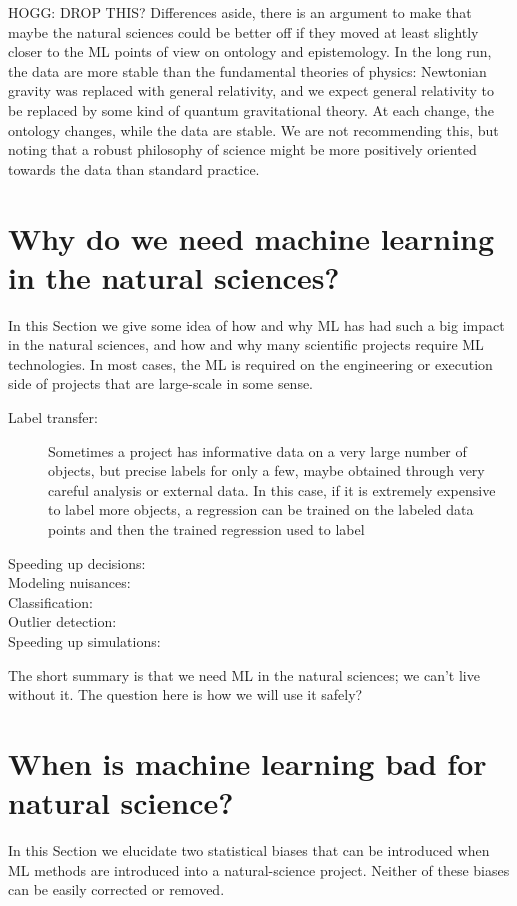 \documentclass[11pt]{article}
\newcommand{\sectionname}{Section}
\begin{document}
HOGG: DROP THIS? Differences aside, there is an argument to make that maybe the natural sciences could be better off if they moved at least slightly closer to the ML points of view on ontology and epistemology.
In the long run, the data are more stable than the fundamental theories of physics:
Newtonian gravity was replaced with general relativity, and we expect general relativity to be replaced by some kind of quantum gravitational theory.
At each change, the ontology changes, while the data are stable.
We are not recommending this, but noting that a robust philosophy of science might be more positively oriented towards the data than standard practice.

\section{Why do we need machine learning in the natural sciences?}
In this \sectionname{} we give some idea of how and why ML has had such a big impact in the natural sciences, and how and why many scientific projects require ML technologies.
In most cases, the ML is required on the engineering or execution side of projects that are large-scale in some sense.
\begin{description}
  \item[Label transfer:] Sometimes a project has informative data on a very large number of objects, but precise labels for only a few, maybe obtained through very careful analysis or external data.
  In this case, if it is extremely expensive to label more objects, a regression can be trained on the labeled data points and then the trained regression used to label
  \item[Speeding up decisions:]
  \item[Modeling nuisances:]
  \item[Classification:]
  \item[Outlier detection:]
  \item[Speeding up simulations:]
\end{description}
The short summary is that we need ML in the natural sciences; we can't live without it.
The question here is how we will use it safely?

\section{When is machine learning bad for natural science?}\label{sec:bad}
In this \sectionname{} we elucidate two statistical biases that can be introduced when ML methods are introduced into a natural-science project.
Neither of these biases can be easily corrected or removed.
\end{document}

